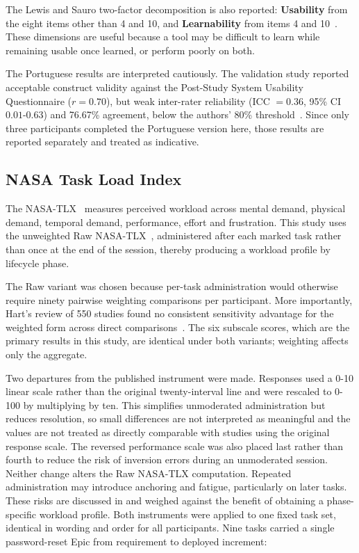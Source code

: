 The Lewis and Sauro two-factor decomposition is also reported: \textbf{Usability} from the eight items other than 4 and 10, and \textbf{Learnability} from items 4 and 10~\cite{Lewis:2009SUS}. These dimensions are useful because a tool may be difficult to learn while remaining usable once learned, or perform poorly on both.

The Portuguese results are interpreted cautiously. The validation study reported acceptable construct validity against the Post-Study System Usability Questionnaire ($r = 0.70$), but weak inter-rater reliability (ICC $=0.36$, 95\% CI $0.01$-$0.63$) and 76.67\% agreement, below the authors' 80\% threshold~\cite{Martins:2015SUS}. Since only three participants completed the Portuguese version here, those results are reported separately and treated as indicative.

\subsection{NASA Task Load Index}
\label{sec:tlx}

The \ac{NASA-TLX}~\cite{Hart:1988TLX} measures perceived workload across mental demand, physical demand, temporal demand, performance, effort and frustration. This study uses the unweighted Raw \ac{NASA-TLX}~\cite{Hart:2006TLX}, administered after each marked task rather than once at the end of the session, thereby producing a workload profile by lifecycle phase.

The Raw variant was chosen because per-task administration would otherwise require ninety pairwise weighting comparisons per participant. More importantly, Hart's review of 550 studies found no consistent sensitivity advantage for the weighted form across direct comparisons~\cite{Hart:2006TLX}. The six subscale scores, which are the primary results in this study, are identical under both variants; weighting affects only the aggregate.

Two departures from the published instrument were made. Responses used a 0-10 linear scale rather than the original twenty-interval line and were rescaled to 0-100 by multiplying by ten. This simplifies unmoderated administration but reduces resolution, so small differences are not interpreted as meaningful and the values are not treated as directly comparable with studies using the original response scale. The reversed performance scale was also placed last rather than fourth to reduce the risk of inversion errors during an unmoderated session. Neither change alters the Raw \ac{NASA-TLX} computation. Repeated administration may introduce anchoring and fatigue, particularly on later tasks. These risks are discussed in  and weighed against the benefit of obtaining a phase-specific workload profile. Both instruments were applied to one fixed task set, identical in wording and order for all participants. Nine tasks carried a single password-reset Epic from requirement to deployed increment:

